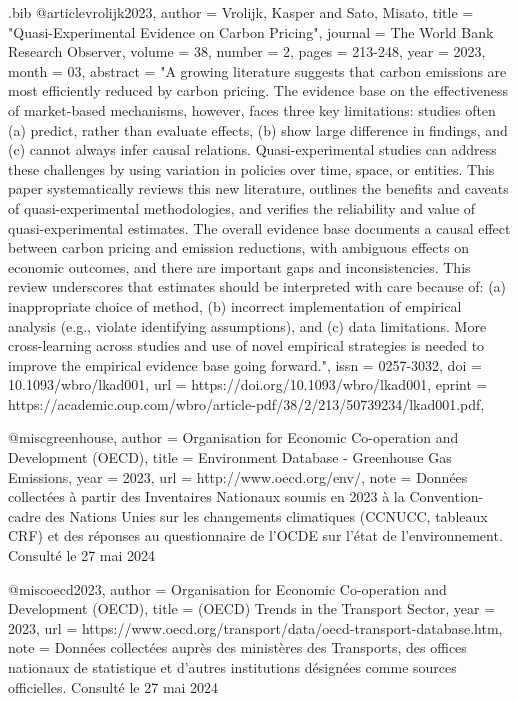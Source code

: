 \begin{filecontents}{.bib}
@article{vrolijk2023,
    author = {Vrolijk, Kasper and Sato, Misato},
    title = "{Quasi-Experimental Evidence on Carbon Pricing}",
    journal = {The World Bank Research Observer},
    volume = {38},
    number = {2},
    pages = {213-248},
    year = {2023},
    month = {03},
    abstract = "{A growing literature suggests that carbon emissions are most efficiently reduced by carbon pricing. The evidence base on the effectiveness of market-based mechanisms, however, faces three key limitations: studies often (a) predict, rather than evaluate effects, (b) show large difference in findings, and (c) cannot always infer causal relations. Quasi-experimental studies can address these challenges by using variation in policies over time, space, or entities. This paper systematically reviews this new literature, outlines the benefits and caveats of quasi-experimental methodologies, and verifies the reliability and value of quasi-experimental estimates. The overall evidence base documents a causal effect between carbon pricing and emission reductions, with ambiguous effects on economic outcomes, and there are important gaps and inconsistencies. This review underscores that estimates should be interpreted with care because of: (a) inappropriate choice of method, (b) incorrect implementation of empirical analysis (e.g., violate identifying assumptions), and (c) data limitations. More cross-learning across studies and use of novel empirical strategies is needed to improve the empirical evidence base going forward.}",
    issn = {0257-3032},
    doi = {10.1093/wbro/lkad001},
    url = {https://doi.org/10.1093/wbro/lkad001},
    eprint = {https://academic.oup.com/wbro/article-pdf/38/2/213/50739234/lkad001.pdf},
}

@misc{greenhouse,
  author = {Organisation for Economic Co-operation and Development (OECD)},
  title = {Environment Database - Greenhouse Gas Emissions},
  year = {2023},
  url = {http://www.oecd.org/env/},
  note = {Données collectées à partir des Inventaires Nationaux soumis en 2023 à la Convention-cadre des Nations Unies sur les changements climatiques (CCNUCC, tableaux CRF) et des réponses au questionnaire de l'OCDE sur l'état de l'environnement. Consulté le 27 mai 2024}
}


@misc{oecd2023,
  author = {Organisation for Economic Co-operation and Development (OECD)},
  title = {(OECD) Trends in the Transport Sector},
  year = {2023},
  url = {https://www.oecd.org/transport/data/oecd-transport-database.htm},
  note = {Données collectées auprès des ministères des Transports, des offices nationaux de statistique et d'autres institutions désignées comme sources officielles. Consulté le 27 mai 2024}
}


\end{filecontents}
